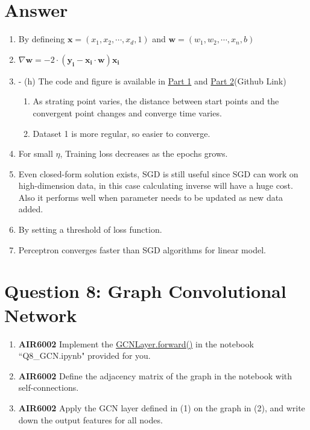 \documentclass[
	12pt, %
]{fphw}
\begin{document}
\section*{Answer}
\begin{enumerate}
	\item By defineing $\mathbf{x} = (x_1,x_2,\cdots,x_d, 1)$ and $\mathbf{w} = (w_1,w_2,\cdots,x_n, b)$
	\item $ \nabla \mathbf{w}= -2 \cdot (\mathbf{y_i} - \mathbf{x_i} \cdot \mathbf{w}) \mathbf{x_i}$
	\item - (h) The code and figure is available in \href{https://github.com/fanyimeng0/AIR6002/blob/main/HW1/Code/notebook_7_part1.ipynb}{Part 1} and 
	\href{https://github.com/fanyimeng0/AIR6002/blob/main/HW1/Code/notebook_7_part2.ipynb}{Part 2}(Github Link)
	\begin{enumerate}[(\itshape 1\normalfont)]
		\item As strating point varies, the distance between start points and the convergent point changes and converge time varies.
		\item Dataset 1 is more regular, so easier to converge.
	\end{enumerate}
	\setcounter{enumi}{6}
	\item For small $\eta$, Training loss decreases as the epochs grows.
	\setcounter{enumi}{8}
	\item Even closed-form solution exists, SGD is still useful since SGD can work on high-dimension data, in this case calculating inverse will have a huge cost. Also it performs well when parameter needs to be updated as new data added. 
	\item By setting a threshold of loss function.
	\item Perceptron converges faster than SGD algorithms for linear model.
\end{enumerate}
\section*{Question 8: Graph Convolutional Network}

\begin{problem}
	\begin{enumerate}
		\item \textbf{AIR6002} Implement the \url{GCNLayer.forward()} in the notebook ``Q8\_GCN.ipynb" provided for you. 
	
		\item \textbf{AIR6002} Define the adjacency matrix of the graph in the notebook with self-connections.  

	
		\item \textbf{AIR6002} Apply the GCN layer defined in (1) on the graph in (2), and write down the output features for all nodes. 
	\end{enumerate}
\end{problem}
\end{document}

